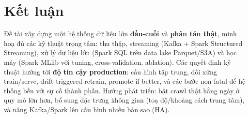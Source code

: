 \documentclass[12pt,a4paper]{article}
\begin{document}
\section{Kết luận}
Đề tài xây dựng một hệ thống dữ liệu lớn \textbf{đầu-cuối} và \textbf{phân tán thật}, minh hoạ đủ các kỹ thuật trọng tâm: thu thập, streaming (Kafka + Spark Structured Streaming), xử lý dữ liệu lớn (Spark SQL trên data lake Parquet/S3A) và học máy (Spark MLlib với tuning, cross-validation, ablation). Các quyết định kỹ thuật hướng tới \textbf{độ tin cậy production}: cấu hình tập trung, đối xứng train/serve, drift-triggered retrain, promote-if-better, và các bước non-fatal để hệ thống bền với sự cố thành phần. Hướng phát triển: bật crawl thật hằng ngày ở quy mô lớn hơn, bổ sung đặc trưng không gian (toạ độ/khoảng cách trung tâm), và nâng Kafka/Spark lên cấu hình nhiều bản sao (HA).
\end{document}
